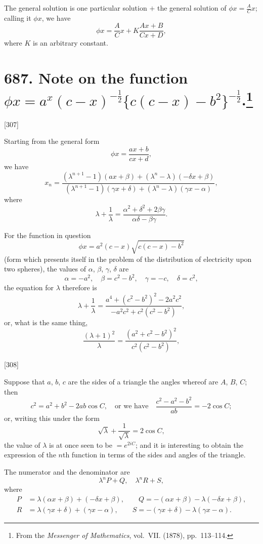 \documentclass[12pt,a4paper]{article}
\theoremstyle{definition}
\begin{document}
The general solution is one particular solution $+$ the general solution of $\phi x = \frac{A}{C}x$; calling it $\phi x$, we have
\[
\phi x = \frac{A}{C}x + K\frac{Ax + B}{Cx + D},
\]
where $K$ is an arbitrary constant.

\newpage
\section[Note on the function $\phi x = a^x(c-x)^{-\frac{1}{2}}\{c(c-x)-b^2\}^{-\frac{1}{2}}$]{687. Note on the function $\phi x = a^x(c-x)^{-\frac{1}{2}}\{c(c-x)-b^2\}^{-\frac{1}{2}}$.\footnote{From the \textit{Messenger of Mathematics}, vol.\ VII. (1878), pp.\ 113--114.}}

[307]

Starting from the general form
\[
\phi x = \frac{ax + b}{cx + d},
\]
we have
\[
x_n = \frac{(\lambda^{n+1} - 1)(ax + \beta) + (\lambda^n - \lambda)(-\delta x + \beta)}
{(\lambda^{n+1} - 1)(\gamma x + \delta) + (\lambda^n - \lambda)(\gamma x - \alpha)},
\]
where
\[
\lambda + \frac{1}{\lambda} = \frac{\alpha^2 + \delta^2 + 2\beta\gamma}{\alpha\delta - \beta\gamma}.
\]

For the function in question
\[
\phi x = a^2(c - x)\sqrt{c(c-x) - b^2}
\]
(form which presents itself in the problem of the distribution of electricity upon two spheres), the values of $\alpha$, $\beta$, $\gamma$, $\delta$ are
\[
\alpha = -a^2,\quad \beta = c^2 - b^2,\quad \gamma = -c,\quad \delta = c^2,
\]
the equation for $\lambda$ therefore is
\[
\lambda + \frac{1}{\lambda} = \frac{a^4 + (c^2 - b^2)^2 - 2a^2c^2}{-a^2c^2 + c^2(c^2 - b^2)},
\]
or, what is the same thing,
\[
\frac{(\lambda + 1)^2}{\lambda} = \frac{(a^2 + c^2 - b^2)^2}{c^2(c^2 - b^2)},
\]

[308]

Suppose that $a$, $b$, $c$ are the sides of a triangle the angles whereof are $A$, $B$, $C$; then
\[
c^2 = a^2 + b^2 - 2ab\cos C,\quad \text{or we have}\quad
\frac{c^2 - a^2 - b^2}{ab} = -2\cos C;
\]
or, writing this under the form
\[
\sqrt{\lambda} + \frac{1}{\sqrt{\lambda}} = 2\cos C,
\]
the value of $\lambda$ is at once seen to be $= e^{2iC}$; and it is interesting to obtain the expression of the $n$th function in terms of the sides and angles of the triangle.

The numerator and the denominator are
\[
\lambda^n P + Q,\quad \lambda^n R + S,
\]
where
\begin{align*}
P &= \lambda(\alpha x + \beta) + (-\delta x + \beta),\qquad
Q = -(\alpha x + \beta) - \lambda(-\delta x + \beta),\\
R &= \lambda(\gamma x + \delta) + (\gamma x - \alpha),\qquad
S = -(\gamma x + \delta) - \lambda(\gamma x - \alpha).
\end{align*}
\end{document}
